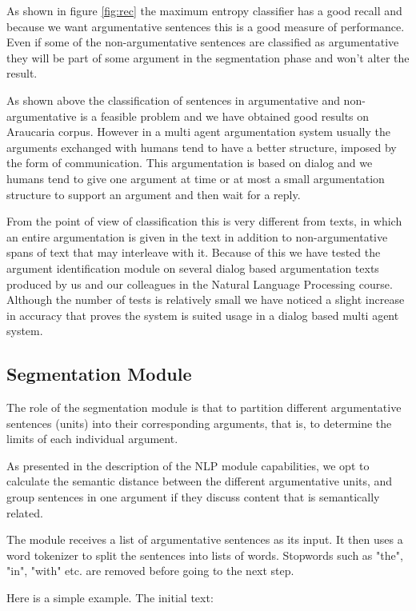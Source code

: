 \par
As shown in figure \ref{fig:rec} the maximum entropy classifier has a good recall and because we want argumentative sentences this is a good measure of performance. Even if some of the non-argumentative sentences are classified as argumentative they will be part of some argument in the segmentation phase and won't alter the result.
\par
As shown above the classification of sentences in argumentative and non-argumentative is a feasible problem and we have obtained good results on Araucaria corpus. However in a multi agent argumentation system usually the arguments exchanged with humans tend to have a better structure, imposed by the form of communication. This argumentation is based on dialog and we humans tend to give one argument at time or at most a small argumentation structure to support an argument and then wait for a reply.
\par
From the point of view of classification this is very different from texts, in which an entire argumentation is given in the text in addition to non-argumentative spans of text that may interleave with it. Because of this we have tested the argument identification module on several dialog based argumentation texts produced by us and our colleagues in the Natural Language Processing course. Although the number of tests is relatively small we have noticed a slight increase in accuracy that proves the system is suited usage in a dialog based multi agent system.

\subsection{Segmentation Module}  
\par
The role of the segmentation module is that to partition different argumentative sentences (units) into their corresponding arguments, that is, to determine the limits of each individual argument.
\par
As presented in the description of the NLP module capabilities, we opt to calculate the semantic distance between the different argumentative units, and group sentences in one argument if they discuss content that is semantically related.
\par
The module receives a list of argumentative sentences as its input. It then uses a word tokenizer to split the sentences into lists of words. Stopwords such as "the", "in", "with" etc. are removed before going to the next step.
\par
Here is a simple example. The initial text:
